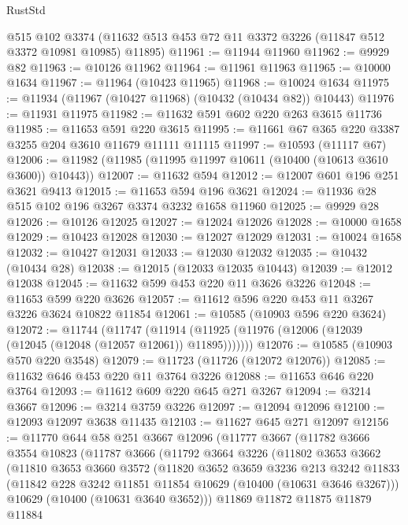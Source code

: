 \begin{lexlean}{RustStd}
\begin{coremodule}
{\begin{coremodule}
{{{{{{{{{{{{{{{{{{{{{{{{{    @515
    @102
    @3374
    (@11632 @513 @453 @72 @11 @3372 @3226 (@11847 @512 @3372 @10981 @10985) @11895)
@11961 := @11944 @11960
@11962 := @9929 @82
@11963 := @10126 @11962
@11964 := @11961 @11963
@11965 := @10000 @1634
@11967 := @11964 (@10423 @11965)
@11968 := @10024 @1634
@11975 := @11934 (@11967 (@10427 @11968) (@10432 (@10434 @82)) @10443)
@11976 := @11931 @11975
@11982 := @11632 @591 @602 @220 @263 @3615 @11736
@11985 := @11653 @591 @220 @3615
@11995 := @11661 @67 @365 @220 @3387 @3255 @204 @3610 @11679 @11111 @11115
@11997 := @10593 (@11117 @67)
@12006 := @11982 (@11985 (@11995 @11997 @10611 (@10400 (@10613 @3610 @3600)) @10443))
@12007 := @11632 @594
@12012 := @12007 @601 @196 @251 @3621 @9413
@12015 := @11653 @594 @196 @3621
@12024 := @11936 @28 @515 @102 @196 @3267 @3374 @3232 @1658 @11960
@12025 := @9929 @28
@12026 := @10126 @12025
@12027 := @12024 @12026
@12028 := @10000 @1658
@12029 := @10423 @12028
@12030 := @12027 @12029
@12031 := @10024 @1658
@12032 := @10427 @12031
@12033 := @12030 @12032
@12035 := @10432 (@10434 @28)
@12038 := @12015 (@12033 @12035 @10443)
@12039 := @12012 @12038
@12045 := @11632 @599 @453 @220 @11 @3626 @3226
@12048 := @11653 @599 @220 @3626
@12057 := @11612 @596 @220 @453 @11 @3267 @3226 @3624 @10822 @11854
@12061 := @10585 (@10903 @596 @220 @3624)
@12072 := @11744
    (@11747 (@11914 (@11925 (@11976 (@12006 (@12039 (@12045 (@12048 (@12057 @12061)) @11895)))))))
@12076 := @10585 (@10903 @570 @220 @3548)
@12079 := @11723 (@11726 (@12072 @12076))
@12085 := @11632 @646 @453 @220 @11 @3764 @3226
@12088 := @11653 @646 @220 @3764
@12093 := @11612 @609 @220 @645 @271 @3267
@12094 := @3214 @3667
@12096 := @3214 @3759 @3226
@12097 := @12094 @12096
@12100 := @12093 @12097 @3638 @11435
@12103 := @11627 @645 @271 @12097
@12156 := @11770
    @644
    @58
    @251
    @3667
    @12096
    (@11777
      @3667
      (@11782
        @3666
        @3554
        @10823
        (@11787
          @3666
          (@11792
            @3664
            @3226
            (@11802
              @3653
              @3662
              (@11810
                @3653
                @3660
                @3572
                (@11820
                  @3652
                  @3659
                  @3236
                  @213
                  @3242
                  @11833
                  (@11842 @228 @3242 @11851 @11854 @10629 (@10400 (@10631 @3646 @3267)))
                  @10629
                  (@10400 (@10631 @3640 @3652)))
                @11869
                @11872
                @11875
                @11879
                @11884
}}}}}}}}}}}}}}}}}}}}}}}}}
\end{coremodule}}
\end{coremodule}
\end{lexlean}
